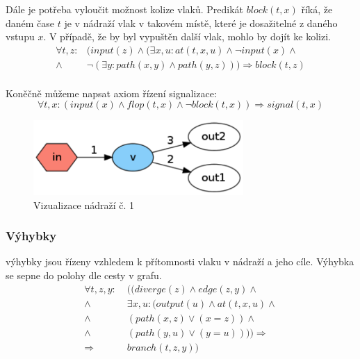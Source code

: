 \documentclass[a4paper,journal]{IEEEtran}
\begin{document}
Dále je potřeba vyloučit možnost kolize vlaků. 
Predikát $block(t,x)$ říká, že daném čase $t$ je v nádraží vlak v takovém místě, 
které je dosažitelné z daného vstupu $x$.
 V případě, že by byl vypuštěn další vlak, mohlo by dojít ke kolizi.
\begin{equation}
\begin{split}
\forall t,z:& (input(z) \wedge (\exists x,u: at(t,x,u) \wedge \neg input(x) \wedge\\
\wedge&\neg (\exists y: path(x,y) \wedge path(y,z) ) ) \Rightarrow block(t,z)\\
\end{split}
\end{equation}

Koněčně můžeme napsat axiom řízení signalizace:
\begin{equation}
\forall t,x: (input(x) \wedge flop(t,x) \wedge \neg block(t,x)) \Rightarrow signal(t,x)
\end{equation}


\begin{figure}[!h] %
  \centering
  \includegraphics[width=80mm]{nadrazi0}
  \caption{Vizualizace nádraží č. 1}
  \label{fig:nad1}
\end{figure}


\subsubsection{Výhybky} výhybky jsou řízeny vzhledem k přítomnosti vlaku v nádraží a jeho cíle.
Výhybka se sepne do polohy dle cesty v grafu.
\begin{equation}
\begin{split}
\forall t,z,y:&\;
(( 
diverge(z) 
\wedge edge(z,y) \wedge\\
\wedge &\; \exists x,u: (output(u) 
						\wedge at(t,x,u) \wedge \\
						\wedge &\; (path(x,z) \vee (x = z)) \wedge \\
						\wedge &\; (path(y,u) \vee (y = u))   )) \Rightarrow \\ 
						\Rightarrow &\; branch(t,z,y)  )\\
\end{split}
\end{equation}
\end{document}

